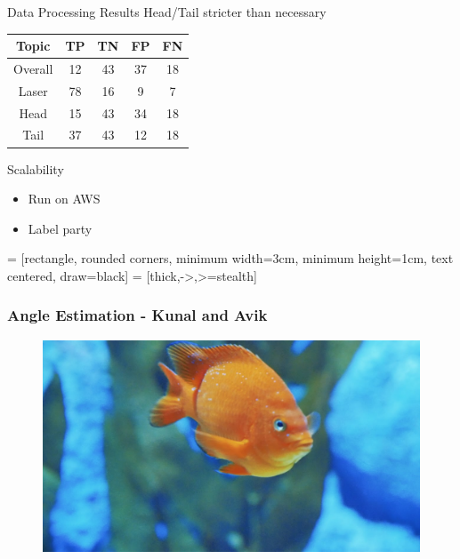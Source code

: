 \begin{frame}{Data Processing Results}
    Head/Tail stricter than necessary

    \begin{center}
        \begin{tabular}{ c | c | c | c | c }
            Topic & TP & TN & FP & FN\\
            \hline
            Overall & 12 & 43 & 37 & 18\\
            Laser & 78 & 16 & 9 & 7\\
            Head & 15 & 43 & 34 & 18\\
            Tail & 37 & 43 & 12 & 18
        \end{tabular}
    \end{center}
\end{frame}

\begin{frame}{Scalability}
    \begin{itemize}
        \item Run on AWS
        \item Label party
    \end{itemize}
\end{frame}

 = [rectangle, rounded corners, 
minimum width=3cm, 
minimum height=1cm,
text centered, 
draw=black]
 = [thick,->,>=stealth]
\begin{frame}
\frametitle{\textbf{Angle Estimation - Kunal and Avik}}
\begin{figure}
    \includegraphics[width=0.5\linewidth]{fishswimming.png}
    \label{fig:fishswimming}
\end{figure}
\end{frame}

